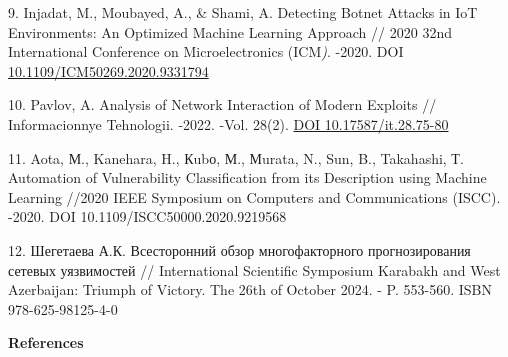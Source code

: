 \begin{references}
9. Injadat, M., Moubayed, A., \& Shami, A. Detecting Botnet Attacks in
IoT Environments: An Optimized Machine Learning Approach // 2020 32nd
International Conference on Microelectronics (ICM\emph{)}. -2020. DOI
\href{https://doi.org/10.1109/ICM50269.2020.9331794}{10.1109/ICM50269.2020.9331794}

10. Pavlov, A. Analysis of Network Interaction of Modern Exploits //
Informacionnye Tehnologii. -2022. -Vol. 28(2).
\href{https://doi.org/10.17587/it.28.75-80}{DOI 10.17587/it.28.75-80}

11. Aota, М., Kanehara, H., Кubо, М., Мurata, N., Sun, B., Takahashi, Т.
Automation of Vulnerability Classification from its Description using
Machine Learning //2020 IEEE Symposium on Computers and Communications
(ISCC). -2020. DOI 10.1109/ISCC50000.2020.9219568

12. Шегетаева А.К. Всесторонний обзор многофакторного прогнозирования
сетевых уязвимостей // International Scientific Symposium Karabakh and
West Azerbaijan: Triumph of Victory. The 26th of October 2024. - P.
553-560. ISBN 978-625-98125-4-0
\end{references}

\begin{center}
{\bfseries References}
\end{center}

